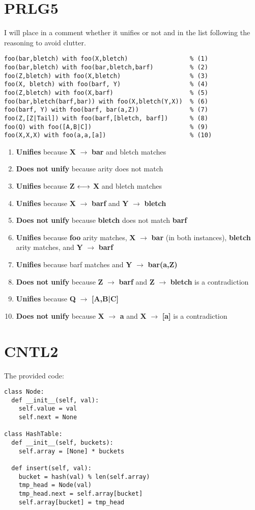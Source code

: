 \section*{PRLG5}
I will place in a comment whether it unifies or not and in the list
following the reasoning to avoid clutter.
\begin{verbatim}
foo(bar,bletch) with foo(X,bletch)                 % (1)
foo(bar,bletch) with foo(bar,bletch,barf)          % (2)
foo(Z,bletch) with foo(X,bletch)                   % (3)
foo(X, bletch) with foo(barf, Y)                   % (4)
foo(Z,bletch) with foo(X,barf)                     % (5)
foo(bar,bletch(barf,bar)) with foo(X,bletch(Y,X))  % (6)
foo(barf, Y) with foo(barf, bar(a,Z))              % (7)
foo(Z,[Z|Tail]) with foo(barf,[bletch, barf])      % (8)
foo(Q) with foo([A,B|C])                           % (9)
foo(X,X,X) with foo(a,a,[a])                       % (10)
\end{verbatim}
\begin{enumerate}
  \item \textbf{Unifies} because \textbf{X} $\to$ \textbf{bar} and bletch matches
  \item \textbf{Does not unify} because arity does not match
  \item \textbf{Unifies} because \textbf{Z} $\longleftrightarrow$ \textbf{X} and bletch matches
  \item \textbf{Unifies} because \textbf{X} $\to$ \textbf{barf} and \textbf{Y} $\to$ \textbf{bletch}
  \item \textbf{Does not unify} because \textbf{bletch} does not match \textbf{barf}
  \item \textbf{Unifies} because \textbf{foo} arity matches, \textbf{X} $\to$ \textbf{bar} (in both instances), \textbf{bletch} arity matches, and \textbf{Y} $\to$ \textbf{barf}
  \item \textbf{Unifies} because barf matches and \textbf{Y} $\to$ \textbf{bar(a,Z)}
  \item \textbf{Does not unify} because \textbf{Z} $\to$ \textbf{barf} and \textbf{Z} $\to$ \textbf{bletch} is a contradiction
  \item \textbf{Unifies} because \textbf{Q} $\to$ \textbf{[A,B|C]}
  \item \textbf{Does not unify} because \textbf{X} $\to$ \textbf{a} and \textbf{X} $\to$ \textbf{[a]} is a contradiction
\end{enumerate}

\section*{CNTL2}
The provided code:
\begin{verbatim}
class Node:
  def __init__(self, val):
    self.value = val
    self.next = None

class HashTable:
  def __init__(self, buckets):
    self.array = [None] * buckets

  def insert(self, val):
    bucket = hash(val) % len(self.array)
    tmp_head = Node(val)
    tmp_head.next = self.array[bucket]
    self.array[bucket] = tmp_head
\end{verbatim}

